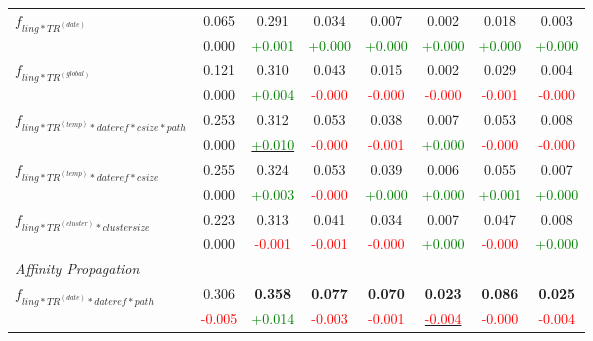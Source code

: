 \documentclass[a4paper,BCOR=10mm]{report}
\numberwithin{lemma}{chapter}
\numberwithin{definition}{chapter}
\begin{document}
\begin{table}
\begin{centering}
{\begin{tabular}{|l|ccccccc|}
\multirow{2}{*}{$f_{ ling*TR^{(date)} }$}   & 0.065 & 0.291 & 0.034 & 0.007 & 0.002 & 0.018 & 0.003 \\
    & 0.000 & \small \textcolor{green}{+0.001}  & \small \textcolor{green}{+0.000}  & \small \textcolor{green}{+0.000}  & \small \textcolor{green}{+0.000}  & \small \textcolor{green}{+0.000}  & \small \textcolor{green}{+0.000} \\\hline
\multirow{2}{*}{$f_{ ling*TR^{(global)} }$} & 0.121 & 0.310 & 0.043 & 0.015 & 0.002 & 0.029 & 0.004 \\
    & 0.000 & \small \textcolor{green}{+0.004}  & \small \textcolor{red}{-0.000}    & \small \textcolor{red}{-0.000}    & \small \textcolor{red}{-0.000}    & \small \textcolor{red}{-0.001}    & \small \textcolor{red}{-0.000} \\\hline
\multirow{2}{*}{$f_{ ling*TR^{(temp)}*\mathit{dateref}*\mathit{csize}*\mathit{path} }$}   & 0.253 & 0.312 & 0.053 & 0.038 & 0.007 & 0.053 & 0.008 \\
    & 0.000 & \underline{\small \textcolor{green}{+0.010}}  & \small \textcolor{red}{-0.000}    & \small \textcolor{red}{-0.001}    & \small \textcolor{green}{+0.000}  & \small \textcolor{red}{-0.000}    & \small \textcolor{red}{-0.000} \\\hline
\multirow{2}{*}{$f_{ ling*TR^{(temp)}*\mathit{dateref}*\mathit{csize} }$}   & 0.255 & 0.324 & 0.053 & 0.039 & 0.006 & 0.055 & 0.007 \\
    & 0.000 & \small \textcolor{green}{+0.003}  & \small \textcolor{red}{-0.000}    & \small \textcolor{green}{+0.000}  & \small \textcolor{green}{+0.000}  & \small \textcolor{green}{+0.001}  & \small \textcolor{green}{+0.000} \\\hline
\multirow{2}{*}{$f_{ \mathit{ling}*TR^{(cluster)}*\mathit{cluster size} }$} & 0.223 & 0.313 & 0.041 & 0.034 & 0.007 & 0.047 & 0.008 \\
    & 0.000 & \small \textcolor{red}{-0.001}    & \small \textcolor{red}{-0.001}    & \small \textcolor{red}{-0.000}    & \small \textcolor{green}{+0.000}  & \small \textcolor{red}{-0.000}    & \small \textcolor{green}{+0.000} \\\hline
\multicolumn{ 8 }{|l|}{ \textit{ Affinity Propagation } }\\\hline
\multirow{2}{*}{$f_{ ling*TR^{(date)}*\mathit{dateref}*\mathit{path} }$}    & 0.306 & \textbf{ 0.358 }  & \textbf{ 0.077 }  & \textbf{ 0.070 }  & \textbf{ 0.023 }  & \textbf{ 0.086 }  & \textbf{ 0.025 } \\
    & \small \textcolor{red}{-0.005}    & \small \textcolor{green}{+0.014}  & \small \textcolor{red}{-0.003}    & \small \textcolor{red}{-0.001}    & \underline{\small \textcolor{red}{-0.004}}    & \small \textcolor{red}{-0.000}    & \small \textcolor{red}{-0.004} \\\hline

\end{tabular}}
\end{centering}
\end{table}
\end{document}
